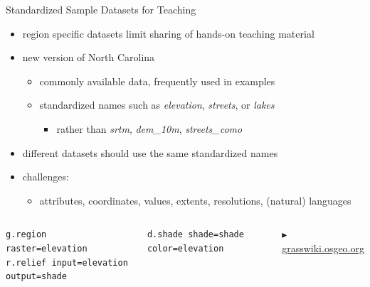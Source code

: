 \documentclass[xcolor={dvipsnames,usenames},beamer,aspectratio=169]{beamer}
\begin{document}
\begin{frame}[fragile]{Standardized Sample Datasets for Teaching}

\begin{itemize}
 \item region specific datasets limit sharing of hands-on teaching material
 \item new version of North Carolina
 \begin{itemize}
  \item commonly available data, frequently used in examples
  \item standardized names such as \textit{elevation}, \textit{streets}, or \textit{lakes}
  \begin{itemize}
   \item rather than \textit{srtm}, \textit{dem\_10m}, \textit{streets\_como}
  \end{itemize}
 \end{itemize}
 \item \alert{different datasets should use the same standardized names}
 \item challenges:
 \begin{itemize}
  \item attributes, coordinates, values, extents, resolutions, (natural) languages
 \end{itemize}

\end{itemize}

\smallskip

\begin{columns}[c]

\scriptsize
\begin{verbatim}
g.region raster=elevation
r.relief input=elevation output=shade
\end{verbatim}
\begin{verbatim}
d.shade shade=shade color=elevation
\end{verbatim}
\vfill\hfill\hfill
\href{http://grasswiki.osgeo.org/wiki/GRASS_GIS_Standardized_Sample_Datasets}{%
$\blacktriangleright$ grasswiki.osgeo.org}


\end{columns}
\end{frame}
\end{document}
